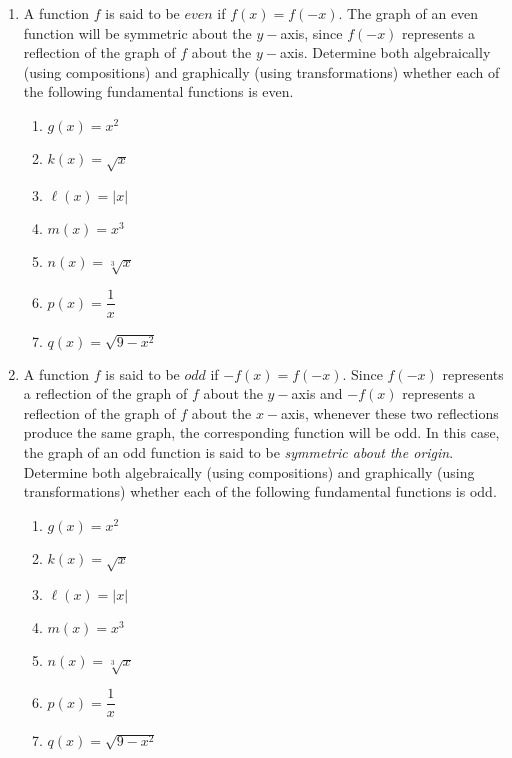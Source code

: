 \begin{enumerate}
\item A function $f$ is said to be $\textit{even}$ if $f(x)=f(-x)$.  The graph of an even function will be symmetric about the $y-$axis, since $f(-x)$ represents a reflection of the graph of $f$ about the $y-$axis.  Determine both algebraically (using compositions) and graphically (using transformations) whether each of the following fundamental functions is even.
\begin{enumerate}
	\item $g(x)=x^2$
	\item $k(x)=\sqrt{x}$
	\item $\ell(x)=|x|$
	\item $m(x)=x^3$
	\item $n(x)=\sqrt[3]{x}$
	\item $p(x)=\dfrac{1}{x}$
	\item $q(x)=\sqrt{9-x^2}$
\end{enumerate}
\item A function $f$ is said to be $\textit{odd}$ if $-f(x)=f(-x)$.  Since $f(-x)$ represents a reflection of the graph of $f$ about the $y-$axis and $-f(x)$ represents a reflection of the graph of $f$ about the $x-$axis, whenever these two reflections produce the same graph, the corresponding function will be odd.   In this case, the graph of an odd function is said to be \textit{symmetric about the origin}.  Determine both algebraically (using compositions) and graphically (using transformations) whether each of the following fundamental functions is odd.
\begin{enumerate}
	\item $g(x)=x^2$
	\item $k(x)=\sqrt{x}$
	\item $\ell(x)=|x|$
	\item $m(x)=x^3$
	\item $n(x)=\sqrt[3]{x}$
	\item $p(x)=\dfrac{1}{x}$
	\item $q(x)=\sqrt{9-x^2}$
\end{enumerate}
\end{enumerate}


\newpage

